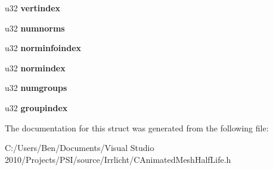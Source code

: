 \begin{DoxyCompactItemize}
\item 
\hypertarget{structirr_1_1scene_1_1_s_halflife_model_a91fe1d241cb6b04d69fddc94c944f2f2}{u32 {\bfseries vertindex}}\label{structirr_1_1scene_1_1_s_halflife_model_a91fe1d241cb6b04d69fddc94c944f2f2}

\item 
\hypertarget{structirr_1_1scene_1_1_s_halflife_model_aa2898d148843fd53819ce80f4d908eb8}{u32 {\bfseries numnorms}}\label{structirr_1_1scene_1_1_s_halflife_model_aa2898d148843fd53819ce80f4d908eb8}

\item 
\hypertarget{structirr_1_1scene_1_1_s_halflife_model_a9c4bcf2b745fdd6b7cff2e1378f6d836}{u32 {\bfseries norminfoindex}}\label{structirr_1_1scene_1_1_s_halflife_model_a9c4bcf2b745fdd6b7cff2e1378f6d836}

\item 
\hypertarget{structirr_1_1scene_1_1_s_halflife_model_a8d90dbac6b30376ee0ea78b47a87a209}{u32 {\bfseries normindex}}\label{structirr_1_1scene_1_1_s_halflife_model_a8d90dbac6b30376ee0ea78b47a87a209}

\item 
\hypertarget{structirr_1_1scene_1_1_s_halflife_model_a08333157bf70bfb4448563e71f5b6587}{u32 {\bfseries numgroups}}\label{structirr_1_1scene_1_1_s_halflife_model_a08333157bf70bfb4448563e71f5b6587}

\item 
\hypertarget{structirr_1_1scene_1_1_s_halflife_model_a00f78748da225d3aef9f3c2c2c6d58a2}{u32 {\bfseries groupindex}}\label{structirr_1_1scene_1_1_s_halflife_model_a00f78748da225d3aef9f3c2c2c6d58a2}

\end{DoxyCompactItemize}


The documentation for this struct was generated from the following file\-:\begin{DoxyCompactItemize}
\item 
C\-:/\-Users/\-Ben/\-Documents/\-Visual Studio 2010/\-Projects/\-P\-S\-I/source/\-Irrlicht/C\-Animated\-Mesh\-Half\-Life.\-h\end{DoxyCompactItemize}
